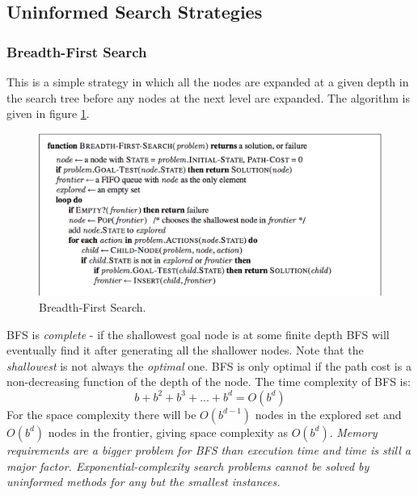 \documentclass[twoside]{article}
\begin{document}
\subsection{Uninformed Search Strategies}
\subsubsection{Breadth-First Search}
This is a simple strategy in which all the nodes are expanded at a given depth
in the search tree before any nodes at the next level are expanded. The 
algorithm is given in figure \ref{fig:bfs}.

\begin{figure}
  \includegraphics[width=\linewidth]{bfs.png}
  \caption{Breadth-First Search.}
  \label{fig:bfs}
\end{figure}
BFS is \emph{complete} - if the shallowest goal node is at some finite depth
BFS will eventually find it after generating all the shallower nodes. Note
that the \emph{shallowest} is not always the \emph{optimal} one. BFS is only 
optimal if the path cost is a non-decreasing function of the depth of the node.
The time complexity of BFS is:
\begin{equation}
    b + b^2 + b^3 + ... + b^d = O(b^d)
\end{equation}
For the space complexity there will be \(O(b^{d-1})\) nodes in the explored set 
and \(O(b^{d})\) nodes in the frontier, giving space complexity as \(O(b^{d})\).
\emph{Memory requirements are a bigger problem for BFS than execution time and
time is still a major factor. Exponential-complexity search problems cannot
be solved by uninformed methods for any but the smallest instances.}
\end{document}
